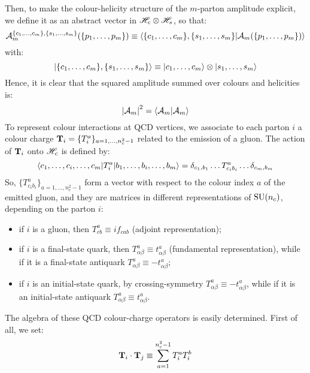 Then, to make the colour-helicity structure of the $ m $-parton amplitude explicit, we define it as an abstract vector in $ \mathscr{H}_c \otimes \mathscr{H}_s $, so that:
\begin{equation}
  \mathcal{A}_m^{\{c_1, \dots, c_m\}, \{s_1, \dots, s_m\}}(\{p_1, \dots, p_m\}) \equiv \braket{\{c_1, \dots, c_m\}, \{s_1, \dots, s_m\} | \mathcal{A}_m(\{p_1, \dots, p_m\})}
\end{equation}
with:
\begin{equation*}
  \ket{\{c_1, \dots, c_m\}, \{s_1, \dots, s_m\}} \equiv \ket{c_1, \dots, c_m} \otimes \ket{s_1, \dots, s_m}
\end{equation*}
Hence, it is clear that the squared amplitude summed over colours and helicities is:
\begin{equation}
  \left\lvert\mathcal{A}_m\right\rvert^2 = \braket{\mathcal{A}_m | \mathcal{A}_m}
\end{equation}
To represent colour interactions at QCD vertices, we associate to each parton $ i $ a colour charge $ \mathbf{T}_i = \{T_i^a\}_{a = 1, \dots, n_c^2 - 1} $ related to the emission of a gluon. The action of $ \mathbf{T}_i $ onto $ \mathscr{H}_c $ is defined by:
\begin{equation}
  \braket{c_1, \dots, c_i, \dots, c_m | T_i^a | b_1, \dots, b_i, \dots, b_m} = \delta_{c_1, b_1} \dots T^a_{c_i b_i} \dots \delta_{c_m, b_m}
  \label{eq:t-act}
\end{equation}
So, $ \{T^a_{c_i b_i}\}_{a = 1, \dots, n_c^2 - 1} $ form a vector with respect to the colour index $ a $ of the emitted gluon, and they are matrices in different representations of $ \mathrm{SU}(n_c) $, depending on the parton $ i $:
\begin{itemize}
  \item if $ i $ is a gluon, then $ T^a_{cb} \equiv i f_{cab} $ (adjoint representation);
  \item if $ i $ is a final-state quark, then $ T^a_{\alpha \beta} \equiv t^a_{\alpha \beta} $ (fundamental representation), while if it is a final-state antiquark $ T^a_{\alpha \beta} \equiv - t^a_{\alpha \beta} $;
  \item if $ i $ is an initial-state quark, by crossing-symmetry $ T^a_{\alpha \beta} \equiv - t^a_{\alpha \beta}$, while if it is an initial-state antiquark $ T^a_{\alpha \beta} \equiv t^a_{\alpha \beta} $.
\end{itemize}
The algebra of these QCD colour-charge operators is easily determined. First of all, we set:
\begin{equation}
  \mathbf{T}_i \cdot \mathbf{T}_j \equiv \sum_{a = 1}^{n_c^2 - 1} T_i^a T_i^b
  \label{eq:t-dot}
\end{equation}
